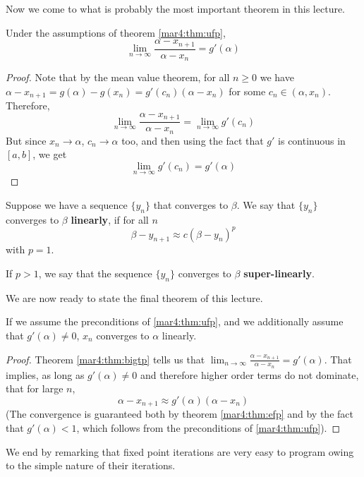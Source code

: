 Now we come to what is probably the most important theorem in this lecture.
\begin{thm}
	Under the assumptions of theorem \ref{mar4:thm:ufp},
	\label{mar4:thm:bigtp}
	\[
		\lim_{n\to\infty} \frac{\alpha - x_{n+1}}{\alpha - x_n} = g'(\alpha)
	\]
\end{thm}
\begin{proof}
	Note that by the mean value theorem, for all $n \geq 0$ we have $\alpha - x_{n+1} = g(\alpha) - g(x_n) = g'(c_n)(\alpha - x_n)$ for some $c_n \in (\alpha, x_n)$. Therefore,
	\[
		\lim_{n\to\infty} \frac{\alpha - x_{n+1}}{\alpha - x_n} = \lim_{n\to\infty} g'(c_n)
	\]
	But since $x_n \to \alpha$, $c_n \to \alpha$ too, and then using the fact that $g'$ is continuous in $[a, b]$, we get
	\[
		\lim_{n\to\infty} g'(c_n) = g'(\alpha)
	\]
	\hfill
\end{proof}

\begin{defn}
	Suppose we have a sequence $\{y_n \}$ that converges to $\beta$. We say that $\{y_n \}$ converges to $\beta$ \textbf{linearly}, if for all $n$
	\[
		\beta - y_{n+1} \approx c(\beta - y_n)^p
	\]
	with $p = 1$.

	If $p > 1$, we say that the sequence $\{y_n \}$ converges to $\beta$ \textbf{super-linearly}.
\end{defn}
We are now ready to state the final theorem of this lecture.
\begin{thm}
	If we assume the preconditions of \ref{mar4:thm:ufp}, and we additionally assume that $g'(\alpha) \neq 0$, $x_n$ converges to $\alpha$ linearly.
\end{thm}
\begin{proof}
	Theorem \ref{mar4:thm:bigtp} tells us that $\lim_{n\to\infty} \frac{\alpha - x_{n+1}}{\alpha - x_n} = g'(\alpha)$. That implies, as long as $g'(\alpha) \neq 0$ and therefore higher order terms do not dominate, that for large $n$,
	\[
		\alpha - x_{n+1} \approx g'(\alpha)(\alpha - x_n)
	\]
	(The convergence is guaranteed both by theorem \ref{mar4:thm:efp} and by the fact that $g'(\alpha) < 1$, which follows from the preconditions of \ref{mar4:thm:ufp}).
	\hfill
\end{proof}

We end by remarking that fixed point iterations are very easy to program owing to the simple nature of their iterations.

